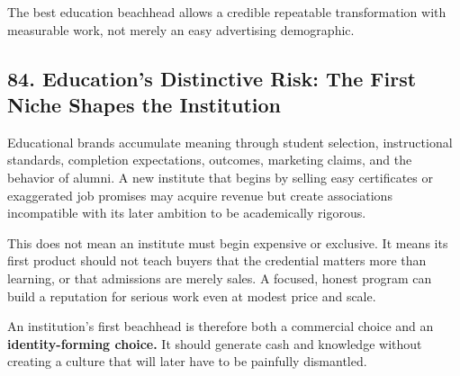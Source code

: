 The best education beachhead allows a credible repeatable transformation with measurable work, not merely an easy advertising demographic.

\subsection*{84. Education's Distinctive Risk: The First Niche Shapes the Institution}

Educational brands accumulate meaning through student selection, instructional standards, completion expectations, outcomes, marketing claims, and the behavior of alumni. A new institute that begins by selling easy certificates or exaggerated job promises may acquire revenue but create associations incompatible with its later ambition to be academically rigorous.

This does not mean an institute must begin expensive or exclusive. It means its first product should not teach buyers that the credential matters more than learning, or that admissions are merely sales. A focused, honest program can build a reputation for serious work even at modest price and scale.

An institution's first beachhead is therefore both a commercial choice and an \textbf{identity-forming choice.} It should generate cash and knowledge without creating a culture that will later have to be painfully dismantled.

